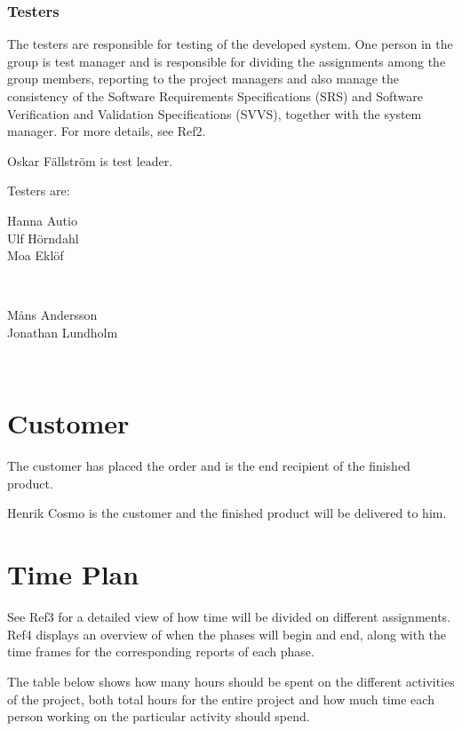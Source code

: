 \documentclass[a4paper]{article}
\begin{document}
\subsubsection{Testers}
The testers are responsible for testing of the developed system. One person in the group is test manager and is responsible for dividing the assignments among the group members, reporting to the project managers and also manage the consistency of the Software Requirements Specifications (SRS) and Software Verification and Validation Specifications (SVVS), together with the system manager. For more details, see Ref2.

Oskar Fällström is test leader.

Testers are:

\begin{minipage}{0.4\textwidth}
\begin{flushleft} 
Hanna Autio\\
Ulf Hörndahl\\
Moa Eklöf
\end{flushleft}
\end{minipage}
~
\begin{minipage}{0.3\textwidth}
\begin{flushleft}
Måns Andersson\\
Jonathan Lundholm
\end{flushleft}
\end{minipage}\\

\section{Customer}
The customer has placed the order and is the end recipient of the finished product.

Henrik Cosmo is the customer and the finished product will be delivered to him.

\section{Time Plan}
See Ref3 for a detailed view of how time will be divided on different assignments. Ref4 displays an overview of when the phases will begin and end, along with the time frames for the corresponding reports of each phase.

The table below shows how many hours should be spent on the different activities of the project, both total hours for the entire project and how much time each person working on the particular activity should spend.
\end{document}
